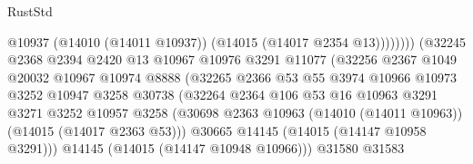 \begin{lexlean}{RustStd}
\begin{coremodule}
                                              @10937
                                              (@14010 (@14011 @10937))
                                              (@14015 (@14017 @2354 @13))))))))
                                  (@32245
                                    @2368
                                    @2394
                                    @2420
                                    @13
                                    @10967
                                    @10976
                                    @3291
                                    @11077
                                    (@32256
                                      @2367
                                      @1049
                                      @20032
                                      @10967
                                      @10974
                                      @8888
                                      (@32265
                                        @2366
                                        @53
                                        @55
                                        @3974
                                        @10966
                                        @10973
                                        @3252
                                        @10947
                                        @3258
                                        @30738
                                        (@32264
                                          @2364
                                          @106
                                          @53
                                          @16
                                          @10963
                                          @3291
                                          @3271
                                          @3252
                                          @10957
                                          @3258
                                          (@30698
                                            @2363
                                            @10963
                                            (@14010 (@14011 @10963))
                                            (@14015 (@14017 @2363 @53)))
                                          @30665
                                          @14145
                                          (@14015 (@14147 @10958 @3291)))
                                        @14145
                                        (@14015 (@14147 @10948 @10966)))
                                      @31580
                                      @31583

\end{coremodule}
\end{lexlean}
